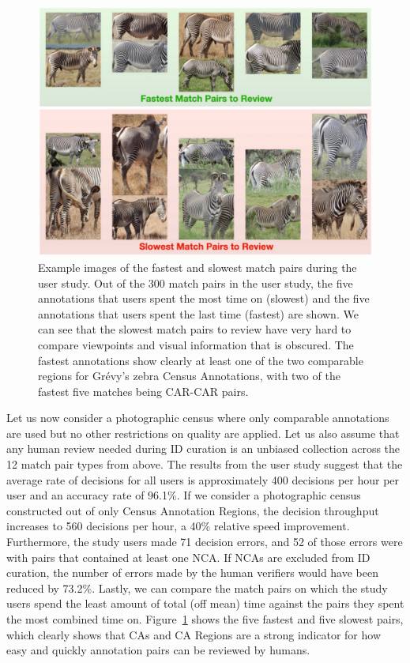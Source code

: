 \begin{figure}[!t]
    \begin{center}
        \includegraphics[width=0.90\linewidth]{resources/user-study-pairs.pdf}
    \end{center}
    \caption{Example images of the fastest and slowest match pairs during the user study.  Out of the 300 match pairs in the user study, the five annotations that users spent the most time on (slowest) and the five annotations that users spent the last time (fastest) are shown.  We can see that the slowest match pairs to review have very hard to compare viewpoints and visual information that is obscured.  The fastest annotations show clearly at least one of the two comparable regions for Gr\'evy's zebra Census Annotations, with two of the fastest five matches being CAR-CAR pairs.}
    \label{fig:user-study-pairs}
\end{figure}

Let us now consider a photographic census where only comparable annotations are used but no other restrictions on quality are applied.  Let us also assume that any human review needed during ID curation is an unbiased collection across the 12 match pair types from above.  The results from the user study suggest that the average rate of decisions for all users is approximately 400 decisions per hour per user and an accuracy rate of 96.1\%.  If we consider a photographic census constructed out of only Census Annotation Regions, the decision throughput increases to 560 decisions per hour, a 40\% relative speed improvement.  Furthermore, the study users made 71 decision errors, and 52 of those errors were with pairs that contained at least one NCA.  If NCAs are excluded from ID curation, the number of errors made by the human verifiers would have been reduced by 73.2\%.  Lastly, we can compare the match pairs on which the study users spend the least amount of total (off mean) time against the pairs they spent the most combined time on.  Figure~\ref{fig:user-study-pairs} shows the five fastest and five slowest pairs, which clearly shows that CAs and CA Regions are a strong indicator for how easy and quickly annotation pairs can be reviewed by humans.

